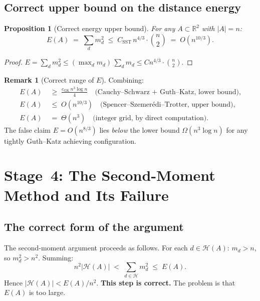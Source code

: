 \documentclass[12pt,a4paper]{amsart}
\theoremstyle{plain}
\newtheorem{proposition}[theorem]{Proposition}
\theoremstyle{definition}
\newtheorem{remark}[theorem]{Remark}
\newcommand{\R}{\mathbb{R}}
\newcommand{\abs}[1]{\left\lvert #1 \right\rvert}
\newcommand{\cH}{\mathcal{H}}
\begin{document}
\subsection{Correct upper bound on the distance energy}

\begin{proposition}[Correct energy upper bound]
\label{prop:E_upper}
For any $A \subset \R^2$ with $\abs{A} = n$:
\[
  E(A) \;=\; \sum_d m_d^2 \;\le\; C_{\mathrm{SST}}\,n^{4/3} \cdot \binom{n}{2}
  \;=\; O(n^{10/3}).
\]
\end{proposition}

\begin{proof}
$E = \sum_d m_d^2 \le (\max_d m_d)\,\sum_d m_d \le C n^{4/3} \cdot \binom{n}{2}$.
\end{proof}

\begin{remark}[Correct range of $E$]
Combining:
\begin{align*}
  E(A) &\;\ge\; \frac{c_{\mathrm{GK}}\,n^3\log n}{4}
         \quad\text{(Cauchy--Schwarz + Guth--Katz, lower bound),}\\
  E(A) &\;\le\; O(n^{10/3})
         \quad\text{(Spencer--Szemer\'edi--Trotter, upper bound),}\\
  E(A) &\;=\; \Theta(n^3)
         \quad\text{(integer grid, by direct computation).}
\end{align*}
The false claim $E = O(n^{8/3})$ lies \emph{below} the lower bound
$\Omega(n^3\log n)$ for any tightly Guth--Katz achieving configuration.
\end{remark}

\section{Stage~4: The Second-Moment Method and Its Failure}
\label{sec:fail}

\subsection{The correct form of the argument}

The second-moment argument proceeds as follows.
For each $d \in \cH(A)$: $m_d > n$, so $m_d^2 > n^2$.  Summing:
\begin{equation}
  n^2 \abs{\cH(A)} \;<\; \sum_{d \in \cH} m_d^2
  \;\le\; E(A).
  \label{eq:template}
\end{equation}
Hence $\abs{\cH(A)} < E(A)/n^2$.  \textbf{This step is correct.}
The problem is that $E(A)$ is too large.
\end{document}
